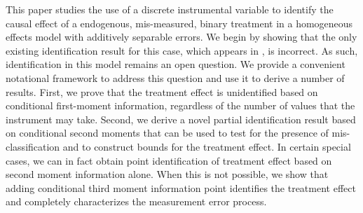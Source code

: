 This paper studies the use of a discrete instrumental variable to identify the causal effect of a endogenous, mis-measured, binary treatment in a homogeneous effects model with additively separable errors.
We begin by showing that the only existing identification result for this case, which appears in \cite{Mahajan}, is incorrect.
As such, identification in this model remains an open question.
We provide a convenient notational framework to address this question and use it to derive a number of results.
First, we prove that the treatment effect is unidentified based on conditional first-moment information, regardless of the number of values that the instrument may take.
Second, we derive a novel partial identification result based on conditional second moments that can be used to test for the presence of mis-classification and to construct bounds for the treatment effect.
In certain special cases, we can in fact obtain point identification of  treatment effect based on second moment information alone.
When this is not possible, we show that adding conditional third moment information point identifies the treatment effect and completely characterizes the measurement error process.
